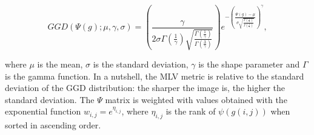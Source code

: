 \begin{equation}
\label{eqn:GGD_distribution}
GGD(\Psi(g); \mu, \gamma, \sigma) =
\left(
    \frac{\gamma}{2 \sigma \Gamma \left( \frac{1}{\gamma} \right) \sqrt{\frac{\Gamma \left( \frac{1}{\gamma} \right)}{\Gamma \left( \frac{3}{\gamma} \right)}}}
\right)
e^{- \left(
        \frac{\Psi(g) - \mu}{\sigma \sqrt{\frac{\Gamma \left( \frac{1}{\gamma} \right)}{\Gamma \left( \frac{3}{\gamma} \right)}}}
    \right)^{\gamma}},
\end{equation}

\noindent where $\mu$ is the mean, $\sigma$ is the standard deviation, $\gamma$ is the shape parameter and $\Gamma$ is the gamma function. In a nutshell, the MLV metric is relative to the standard deviation of the GGD distribution: the sharper the image is, the higher the standard deviation. The $\Psi$ matrix is weighted with values obtained with the exponential function $w_{i,j} = e^{\eta_{i,j}}$, where $\eta_{i,j}$ is the rank of $\psi(g(i,j))$ when sorted in ascending order.